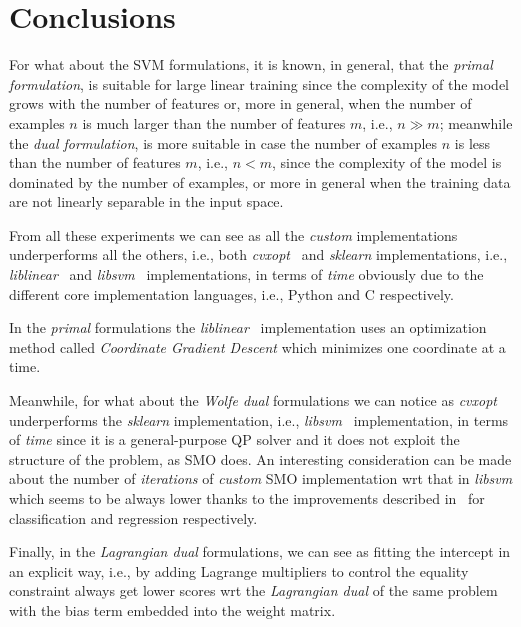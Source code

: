 \section{Conclusions}

For what about the SVM formulations, it is known, in general, that the \emph{primal formulation}, is suitable for large linear training since the complexity of the model grows with the number of features or, more in general, when the number of examples $n$ is much larger than the number of features $m$, i.e., $n \gg m$; meanwhile the \emph{dual formulation}, is more suitable in case the number of examples $n$ is less than the number of features $m$, i.e., $n < m$, since the complexity of the model is dominated by the number of examples, or more in general when the training data are not linearly separable in the input space.

\bigskip

From all these experiments we can see as all the \emph{custom} implementations underperforms all the others, i.e., both \emph{cvxopt}~\cite{vandenberghe2010cvxopt} and \emph{sklearn} implementations, i.e., \emph{liblinear}~\cite{fan2008liblinear} and \emph{libsvm}~\cite{chang2011libsvm} implementations, in terms of \emph{time} obviously due to the different core implementation languages, i.e., Python and C respectively.

In the \emph{primal} formulations the \emph{liblinear}~\cite{fan2008liblinear} implementation uses an optimization method called \emph{Coordinate Gradient Descent} which minimizes one coordinate at a time.

Meanwhile, for what about the \emph{Wolfe dual} formulations we can notice as \emph{cvxopt}~\cite{vandenberghe2010cvxopt} underperforms the \emph{sklearn} implementation, i.e., \emph{libsvm}~\cite{chang2011libsvm} implementation, in terms of \emph{time} since it is a general-purpose QP solver and it does not exploit the structure of the problem, as SMO does. An interesting consideration can be made about the number of \emph{iterations} of \emph{custom} SMO implementation wrt that in \emph{libsvm} which seems to be always lower thanks to the improvements described in~\cite{keerthi2001improvements, shevade1999improvements} for classification and regression respectively.

Finally, in the \emph{Lagrangian dual} formulations, we can see as fitting the intercept in an explicit way, i.e., by adding Lagrange multipliers to control the equality constraint always get lower scores wrt the \emph{Lagrangian dual} of the same problem with the bias term embedded into the weight matrix.

